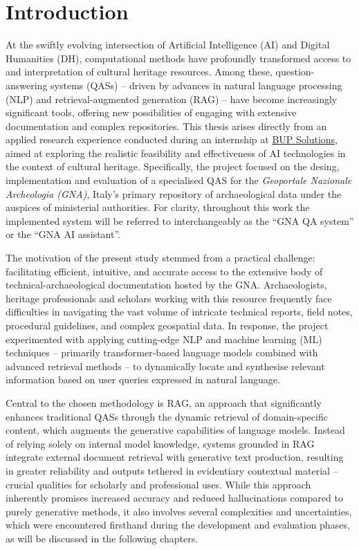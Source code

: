 \chapter{Introduction}
\label{chap:introduction}
\begin{spacing}{1.5}  %
At the swiftly evolving intersection of Artificial Intelligence (AI) and Digital Humanities (DH), computational methods have profoundly transformed access to and interpretation of cultural heritage resources. Among these, question-answering systems (QASs) -- driven by advances in natural language processing (NLP) and retrieval-augmented generation (RAG) -- have become increasingly significant tools, offering new possibilities of engaging with extensive documentation and complex repositories. This thesis arises directly from an applied research experience conducted during an internship at \href{https://www.bupsolutions.com/en/home_en/}{BUP Solutions}\nocite{bup_solutions_bup_nodate}, aimed at exploring the realistic feasibility and effectiveness of AI technologies in the context of cultural heritage. Specifically, the project focused on the desing, implementation and evaluation of a specialised QAS for the \textit{Geoportale Nazionale Archeologia (GNA)}, Italy’s primary repository of archaeological data under the auspices of ministerial authorities. For clarity, throughout this work the implemented system will be referred to interchangeably as the ``GNA QA system'' or the ``GNA AI assistant''.

The motivation of the present study stemmed from a practical challenge: facilitating efficient, intuitive, and accurate access to the extensive body of technical-archaeological documentation hosted by the GNA. Archaeologists, heritage professionals and scholars working with this resource frequently face difficulties in navigating the vast volume of intricate technical reports, field notes, procedural guidelines, and complex geospatial data. In response, the project experimented with applying cutting-edge NLP and machine learning (ML) techniques -- primarily transformer-based language models combined with advanced retrieval methods -- to dynamically locate and synthesise relevant information based on user queries expressed in natural language.

Central to the chosen methodology is RAG, an approach that significantly enhances traditional QASs through the dynamic retrieval of domain-specific content, which augments the generative capabilities of language models. Instead of relying solely on internal model knowledge, systems grounded in RAG integrate external document retrieval with generative text production, resulting in greater reliability and outputs tethered in evidentiary contextual material -- crucial qualities for scholarly and professional uses. While this approach inherently promises increased accuracy and reduced hallucinations compared to purely generative methods, it also involves several complexities and uncertainties, which were encountered firsthand during the development and evaluation phases, as will be discussed in the following chapters.


\end{spacing}

